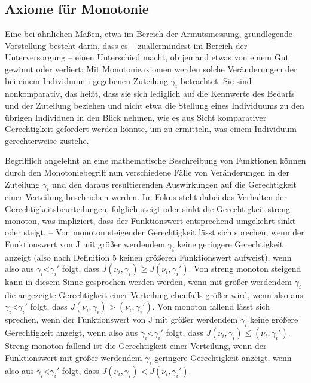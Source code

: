 \documentclass[a4paper]{thesis}
\begin{document}
\subsection{Axiome für Monotonie}
Eine bei ähnlichen Maßen, etwa im Bereich der Armutsmessung, grundlegende Vorstellung besteht darin, dass es -- zuallermindest im Bereich der Unterversorgung -- einen Unterschied macht, ob jemand etwas von einem Gut gewinnt oder verliert: Mit Monotonieaxiomen werden solche Veränderungen der bei einem Individuum i gegebenen Zuteilung $\gamma_i$ betrachtet. Sie sind nonkomparativ, das heißt, dass sie sich lediglich auf die Kennwerte des Bedarfs und der Zuteilung beziehen und nicht etwa die Stellung eines Individuums zu den übrigen Individuen in den Blick nehmen, wie es aus Sicht komparativer Gerechtigkeit gefordert werden könnte, um zu ermitteln, was einem Individuum gerechterweise zustehe.

Begrifflich angelehnt an eine mathematische Beschreibung von Funktionen können durch den Monotoniebegriff nun verschiedene Fälle von Veränderungen in der Zuteilung $\gamma_i$ und den daraus resultierenden Auswirkungen auf die Gerechtigkeit einer Verteilung beschrieben werden. Im Fokus steht dabei das Verhalten der Gerechtigkeitsbeurteilungen, folglich steigt oder sinkt die Gerechtigkeit streng monoton, was impliziert, dass der Funktionswert entsprechend umgekehrt sinkt oder steigt. -- Von monoton steigender Gerechtigkeit lässt sich sprechen, wenn der Funktionswert von J mit größer werdendem $\gamma_i$ keine geringere Gerechtigkeit anzeigt (also nach Definition 5 keinen größeren Funktionswert aufweist), wenn also aus $\gamma_i$<$\gamma_i\prime$ folgt, dass $J(\nu_i,\gamma_i)\ge J(\nu_i,\gamma_i\prime)$. Von streng monoton steigend kann in diesem Sinne gesprochen werden werden, wenn mit größer werdendem $\gamma_i$ die angezeigte Gerechtigkeit einer Verteilung ebenfalls größer wird, wenn also aus $\gamma_i$<$\gamma_i\prime$ folgt, dass $J(\nu_i,\gamma_i)>(\nu_i,\gamma_i\prime)$. Von monoton fallend lässt sich sprechen, wenn der Funktionswert von J mit größer werdendem $\gamma_i$ keine größere Gerechtigkeit anzeigt, wenn also aus $\gamma_i$<$\gamma_i\prime$ folgt, dass $J(\nu_i,\gamma_i)\le(\nu_i,\gamma_i\prime)$. Streng monoton fallend ist die Gerechtigkeit einer Verteilung, wenn der Funktionswert mit größer werdendem $\gamma_i$ geringere Gerechtigkeit anzeigt, wenn also aus $\gamma_i$<$\gamma_i\prime$ folgt, dass $J(\nu_i,\gamma_i)<J(\nu_i,\gamma_i\prime)$.
\end{document}
